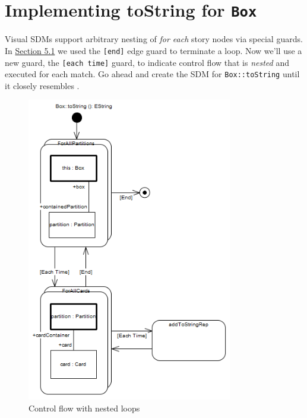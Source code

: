 \newpage
\hypertarget{stringRep vis}{}
\section{Implementing toString for \texttt{Box}}
\genHeader

\begin{stepbystep}

\item Visual SDMs support arbitrary nesting of \emph{for each} story nodes via special guards. In \hyperlink{emptyPartition vis}{Section
5.1} we used the \texttt{[end]} edge guard to terminate a loop. Now we'll use a new guard, the \texttt{[each time]} guard, to indicate
control flow that is \emph{nested} and executed for each match. Go ahead and create the SDM for \texttt{Box::toString} until it closely resembles
.

\begin{figure}[htbp]
\begin{center}
  \includegraphics[width=0.8\textwidth]{../../org.moflon.doc.handbook.03_storyDiagrams/10_stringRep/visSRImages/ea_toStringStart}
  \caption{Control flow with nested loops} 
  \label{ea:sdm_tostring_1}
\end{center}
\end{figure}


\end{stepbystep}
